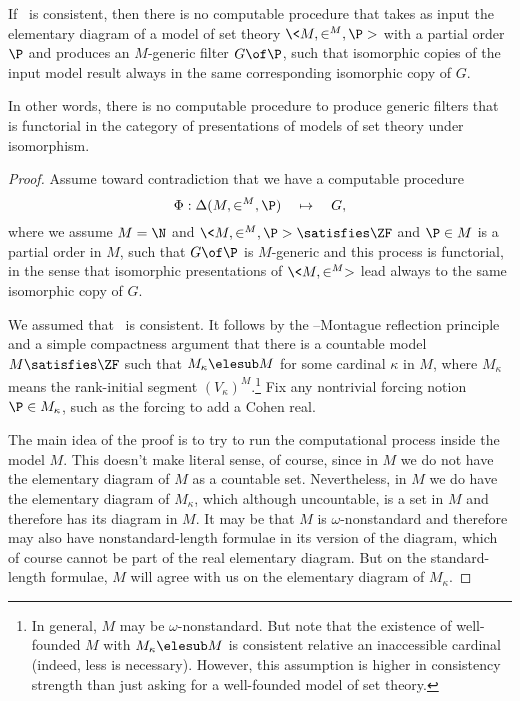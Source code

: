 \documentclass{amsart}
\begin{document}
 \begin{theorem}\label{Theorem.No-Turing-functor}
  If \ZF\ is consistent, then there is no computable procedure that takes as input the elementary diagram of a model of set theory $\<M,\in^M,\P>$ with a partial order $\P$ and produces an $M$-generic filter $G\of \P$, such that isomorphic copies of the input model result always in the same corresponding isomorphic copy of $G$.
 \end{theorem}
 
 \noindent In other words, there is no computable procedure to produce generic filters that is functorial in the category of presentations of models of set theory under isomorphism.
 
 \begin{proof}
 Assume toward contradiction that we have a computable procedure
  $$\Phi:\Delta(M,\in^M,\P)\quad\mapsto\quad G,$$
 where we assume $M=\N$ and $\<M,\in^M,\P>\satisfies\ZF$ and $\P\in M$ is a partial order in $M$, such that $G\of\P$ is $M$-generic and this process is functorial, in the sense that isomorphic presentations of $\<M,\in^M>$ lead always to the same isomorphic copy of $G$.
 
 We assumed that \ZF\ is consistent. It follows by the \Levy--Montague reflection principle and a simple compactness argument that there is a countable model $M\satisfies\ZF$ such that $M_\kappa\elesub M$ for some cardinal $\kappa$ in $M$, where $M_\kappa$ means the rank-initial segment $(V_\kappa)^M$.\footnote{In general, $M$ may be $\omega$-nonstandard. But note that the existence of well-founded $M$ with $M_\kappa \elesub M$ is consistent relative an inaccessible cardinal (indeed, less is necessary). However, this assumption is higher in consistency strength than just asking for a well-founded model of set theory.}
 Fix any nontrivial forcing notion $\P\in M_\kappa$, such as the forcing to add a Cohen real.
 
 The main idea of the proof is to try to run the computational process inside the model $M$. This doesn't make literal sense, of course, since in $M$ we do not have the elementary diagram of $M$ as a countable set. Nevertheless, in $M$ we do have the elementary diagram of $M_\kappa$, which although uncountable, is a set in $M$ and therefore has its diagram in $M$. It may be that $M$ is $\omega$-nonstandard and therefore may also have nonstandard-length formulae in its version of the diagram, which of course cannot be part of the real elementary diagram. But on the standard-length formulae, $M$ will agree with us on the elementary diagram of $M_\kappa$.
 

\end{proof}
\end{document}
